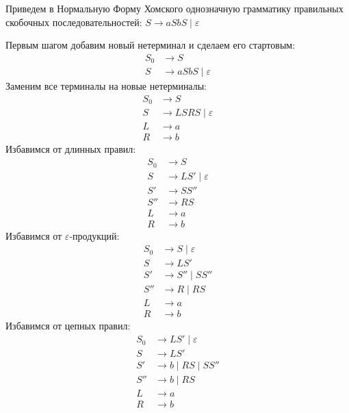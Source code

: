 \begin{example}
  Приведем в Нормальную Форму Хомского однозначную грамматику правильных скобочных последовательностей: $S \to a S b S \mid \varepsilon$

  Первым шагом добавим новый нетерминал и сделаем его стартовым:
  \begin{align*}
    S_0 &\to S  \\
    S   &\to a S b S \mid \varepsilon
  \end{align*}
  Заменим все терминалы на новые нетерминалы:
  \begin{align*}
    S_0 &\to S \\
    S   &\to L S R S \mid \varepsilon \\
    L   &\to a \\
    R   &\to b
  \end{align*}
  Избавимся от длинных правил:
  \begin{align*}
    S_0 &\to S \\
    S   &\to L S' \mid \varepsilon \\
    S'  &\to S S'' \\
    S'' &\to R S \\
    L   &\to a \\
    R   &\to b
  \end{align*}
  Избавимся от $\varepsilon$-продукций:
  \begin{align*}
    S_0 &\to S \mid \varepsilon \\
    S   &\to L S' \\
    S'  &\to S'' \mid S S'' \\
    S'' &\to R   \mid R S \\
    L   &\to a \\
    R   &\to b
  \end{align*}
  Избавимся от цепных правил:
  \begin{align*}
    S_0 &\to L S' \mid \varepsilon \\
    S   &\to L S' \\
    S'  &\to b \mid R S \mid S S'' \\
    S'' &\to b \mid R S \\
    L   &\to a \\
    R   &\to b
  \end{align*}
\end{example}

